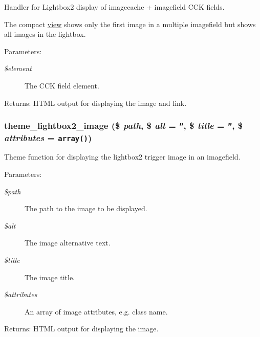Handler for Lightbox2 display of imagecache + imagefield CCK fields.

The compact \hyperlink{classview}{view} shows only the first image in a multiple imagefield but shows all images in the lightbox.

\begin{Desc}
\item[Parameters:]
\begin{description}
\item[{\em \$element}]The CCK field element. \end{description}
\end{Desc}
\begin{Desc}
\item[Returns:]HTML output for displaying the image and link. \end{Desc}
\hypertarget{lightbox2_8formatter_8inc_4ba8a7f504a1255b4770051408c3a7c4}{
\subsubsection[{theme\_\-lightbox2\_\-image}]{\setlength{\rightskip}{0pt plus 5cm}theme\_\-lightbox2\_\-image (\$ {\em path}, \/  \$ {\em alt} = {\tt ''}, \/  \$ {\em title} = {\tt ''}, \/  \$ {\em attributes} = {\tt array()})}}
\label{lightbox2_8formatter_8inc_4ba8a7f504a1255b4770051408c3a7c4}


Theme function for displaying the lightbox2 trigger image in an imagefield.

\begin{Desc}
\item[Parameters:]
\begin{description}
\item[{\em \$path}]The path to the image to be displayed. \item[{\em \$alt}]The image alternative text. \item[{\em \$title}]The image title. \item[{\em \$attributes}]An array of image attributes, e.g. class name. \end{description}
\end{Desc}
\begin{Desc}
\item[Returns:]HTML output for displaying the image. \end{Desc}
